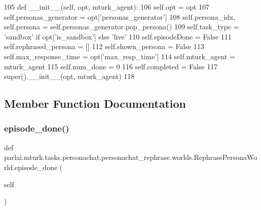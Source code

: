 \begin{DoxyCode}
105     \textcolor{keyword}{def }\_\_init\_\_(self, opt, mturk\_agent):
106         self.opt = opt
107         self.personas\_generator = opt[\textcolor{stringliteral}{'personas\_generator'}]
108         self.persona\_idx, self.persona = self.personas\_generator.pop\_persona()
109         self.task\_type = \textcolor{stringliteral}{'sandbox'} \textcolor{keywordflow}{if} opt[\textcolor{stringliteral}{'is\_sandbox'}] \textcolor{keywordflow}{else} \textcolor{stringliteral}{'live'}
110         self.episodeDone = \textcolor{keyword}{False}
111         self.rephrased\_persona = []
112         self.shown\_persona = \textcolor{keyword}{False}
113         self.max\_response\_time = opt[\textcolor{stringliteral}{'max\_resp\_time'}]
114         self.mturk\_agent = mturk\_agent
115         self.num\_done = 0
116         self.completed = \textcolor{keyword}{False}
117         super().\_\_init\_\_(opt, mturk\_agent)
118 
\end{DoxyCode}


\subsection{Member Function Documentation}
\mbox{\label{classparlai_1_1mturk_1_1tasks_1_1personachat_1_1personachat__rephrase_1_1worlds_1_1RephrasePersonaWorld_ac28503baefd501823d761360bb07356e}} 
\subsubsection{\texorpdfstring{episode\+\_\+done()}{episode\_done()}}
{\footnotesize\ttfamily def parlai.\+mturk.\+tasks.\+personachat.\+personachat\+\_\+rephrase.\+worlds.\+Rephrase\+Persona\+World.\+episode\+\_\+done (\begin{DoxyParamCaption}\item[{}]{self }\end{DoxyParamCaption})}



